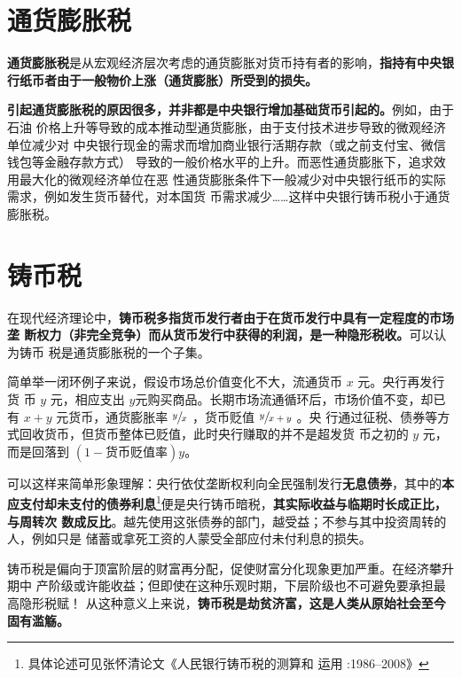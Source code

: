 \section{通货膨胀税}

\textbf{通货膨胀税}是从宏观经济层次考虑的通货膨胀对货币持有者的影响，\textbf{指持有中央银
  行纸币者由于一般物价上涨（通货膨胀）所受到的损失。}

\textbf{引起通货膨胀税的原因很多，并非都是中央银行增加基础货币引起的。}例如，由于石油
价格上升等导致的成本推动型通货膨胀，由于支付技术进步导致的微观经济单位减少对
中央银行现金的需求而增加商业银行活期存款（或之前支付宝、微信钱包等金融存款方式）
导致的一般价格水平的上升。而恶性通货膨胀下，追求效用最大化的微观经济单位在恶
性通货膨胀条件下一般减少对中央银行纸币的实际需求，例如发生货币替代，对本国货
币需求减少……这样中央银行铸币税小于通货膨胀税。

\section{铸币税}

在现代经济理论中，\textbf{铸币税多指货币发行者由于在货币发行中具有一定程度的市场垄
  断权力（非完全竞争）而从货币发行中获得的利润，是一种隐形税收。}可以认为铸币
税是通货膨胀税的一个子集。

简单举一闭环例子来说，假设市场总价值变化不大，流通货币 $x$ 元。央行再发行货
币 $y$ 元，相应支出 $y$元购买商品。长期市场流通循环后，市场价值不变，却已
有 $x+y$ 元货币，通货膨胀率 $ \sfrac{y}{x}$ ，货币贬值 $\sfrac{y}{x+y}$ 。央
行通过征税、债券等方式回收货币，但货币整体已贬值，此时央行赚取的并不是超发货
币之初的 $y$ 元，而是回落到 $(1 - 货币贬值率)y$。


可以这样来简单形象理解：央行依仗垄断权利向全民强制发行\textbf{无息债券}，其中的\textbf{本
  应支付却未支付的债券利息}\footnote{具体论述可见张怀清论文《人民银行铸币税的测算和
  运用 :1986--2008》}便是央行铸币暗税，\textbf{其实际收益与临期时长成正比，与周转次
  数成反比}。越先使用这张债券的部门，越受益；不参与其中投资周转的人，例如只是
储蓄或拿死工资的人蒙受全部应付未付利息的损失。

铸币税是偏向于顶富阶层的财富再分配，促使财富分化现象更加严重。在经济攀升期中
产阶级或许能收益；但即使在这种乐观时期，下层阶级也不可避免要承担最高隐形税赋！
从这种意义上来说，\textbf{铸币税是劫贫济富，这是人类从原始社会至今固有滥觞。}


